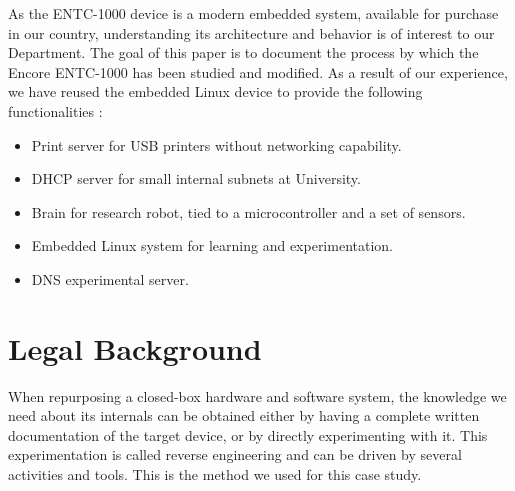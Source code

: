 \documentclass[conference]{IEEEtran}
\newcommand{\nota}[1]{}
\begin{document}
\nota{Es de interés para nuestra facultad el entendimiento de la arquitectura y funcionamiento
de los dispositivos ENTC-1000,
ya que se trata de un sistema embebido moderno, y disponible
para su adquisición en el país. Conocer su funcionamiento interno
nos permite la experimentación académica con Linux embebido. Y,
por último, pero no menos importante, permite su reuso para necesidades
específicas en el marco de los sistemas embebidos.
}

As the ENTC-1000 device is a modern embedded system, available for purchase in our country, understanding its architecture and behavior is of interest to our Department.  
The goal of this paper is to document the process by which the Encore ENTC-1000
has been studied and modified. As a result of our experience,
we have reused the embedded Linux device to provide the following functionalities :

\begin{itemize}
\item Print server for USB printers without networking capability. 
\item DHCP server for small internal subnets at University. 
\item Brain for research robot, tied to a microcontroller and a set of sensors. 
\item Embedded Linux system for learning and experimentation.  
\item DNS experimental server.  
\end{itemize}


\section{Legal Background}

\nota{ Marco Jurídico }

\nota{Cuando reutilizamos un sistema embebido de hardware y software cerrado, necesitamos la
documentación completa de las especificaciones del dispositivo.
Si esa documentación no existe, o si no existe
completamente, es necesario descubrir su funcionamiento mediante
diferentes pruebas. Este último método es el elegido en este artículo, y es lo que 
se denomina ingeniería inversa.}

When repurposing a closed-box hardware and software system, the knowledge we need about its internals can be obtained either by having a complete written documentation of the target device, or by directly experimenting with it. This experimentation is called reverse engineering and can be driven by several activities and tools. This is the method we used for this case study.
\end{document}
